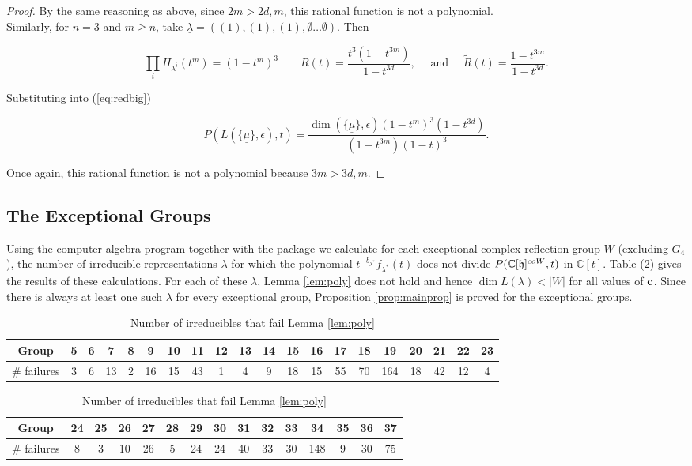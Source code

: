 \documentclass[a4apper,10pt]{amsart}
\theoremstyle{definition}
\numberwithin{thm}{section}
\newcommand{\C}{\mathbb{C}}
\begin{document}
\begin{proof}
\noindent By the same reasoning as above, since $2m > 2d, m$, this rational function is not a polynomial.\\


\noindent Similarly, for $n = 3$ and $m \ge n$, take $\underline{\lambda} = ((1), (1), (1), \emptyset \dots \emptyset )$. Then

\begin{displaymath}
\prod_i H_{\lambda^i}(t^m) = (1 - t^m)^3 \qquad R(t) = \frac{t^3(1 - t^{3m})}{1 - t^{3d}}, \quad \textrm{ and } \quad  \tilde{R}(t) = \frac{1 - t^{3m}}{1 - t^{3d}}.
\end{displaymath}

\noindent Substituting into (\ref{eq:redbig}) 

\begin{displaymath}
P(L( \{ \underline{\mu} \},\epsilon),t) = \frac{\dim ( \{ \underline{\mu} \},\epsilon) (1 - t^m)^3 (1 - t^{3d})}{(1 - t^{3m})(1 - t)^3}.
\end{displaymath}

\noindent Once again, this rational function is not a polynomial because $3m > 3d, m$.
\end{proof}

\subsection{The Exceptional Groups}

Using the computer algebra program \cite{2} together with the package \cite{3} we calculate for each exceptional complex reflection group $W$ (excluding $G_4$), the number of irreducible representations $\lambda$ for which the polynomial $t^{-b_{\lambda^*}} f_{\lambda^*}(t)$ does not divide $P(\C[\frak{h}]^{coW},t)$ in $\C[t]$. Table (\ref{tab:tab1}) gives the results of these calculations. For each of these $\lambda$, Lemma \ref{lem:poly} does not hold and hence $\dim L(\lambda) < |W|$ for all values of $\bf{c}$. Since there is always at least one such $\lambda$ for every exceptional group, Proposition \ref{prop:mainprop} is proved for the exceptional groups.

\begin{table}[h]\label{tab:tab1}
\centering
\caption{Number of irreducibles that fail Lemma \ref{lem:poly}}
\begin{tabular}{c|ccccccccccccccccccc}
Group & 5 & 6 & 7 & 8 & 9 & 10 & 11 & 12 & 13 & 14 & 15 & 16 & 17 & 18 & 19 & 20 & 21 & 22 & 23 \\
\hline\hline
\# failures & 3 & 6 & 13 & 2 & 16 & 15 & 43 & 1 & 4 & 9 & 18 & 15 & 55 & 70 & 164 & 18 & 42 & 12 & 4 
\end{tabular}
\begin{tabular}{c|cccccccccccccc}
Group & 24 & 25 & 26 & 27 & 28 & 29 & 30 & 31 & 32 & 33 & 34 & 35 & 36 & 37 \\
\hline\hline
\# failures & 8 & 3 & 10 & 26 & 5 & 24 & 24 & 40 & 33 & 30 & 148 & 9 & 30 & 75
\end{tabular}
\end{table}
\end{document}
